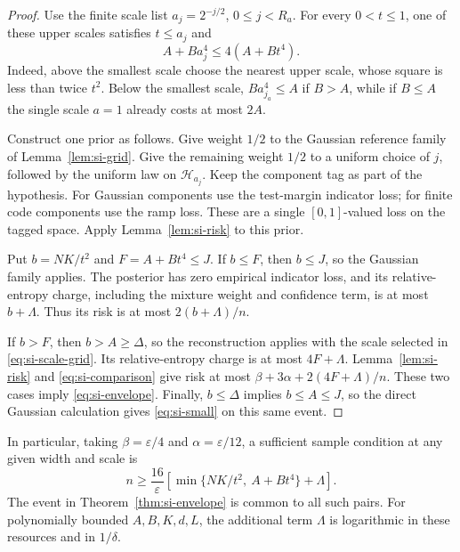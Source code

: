 \begin{proof}
Use the finite scale list $a_j=2^{-j/2}$, $0\le j<R_a$.
For every $0<t\le1$, one of these upper scales satisfies $t\le a_j$ and
\begin{equation}\label{eq:si-scale-grid}
 A+Ba_j^4\le4(A+Bt^4).
\end{equation}
Indeed, above the smallest scale choose the nearest upper scale, whose
square is less than twice $t^2$. Below the smallest scale,
$Ba_{j_a}^4\le A$ if $B>A$, while if $B\le A$ the single scale $a=1$
already costs at most $2A$.

Construct one prior as follows. Give weight $1/2$ to the Gaussian
reference family of Lemma~\ref{lem:si-grid}. Give the remaining weight
$1/2$ to a uniform choice of $j$, followed by the uniform law on
$\mathcal H_{a_j}$. Keep the component tag as part of the hypothesis.
For Gaussian components use the test-margin indicator loss; for finite
code components use the ramp loss. These are a single $[0,1]$-valued loss
on the tagged space. Apply Lemma~\ref{lem:si-risk} to this prior.

Put $b=NK/t^2$ and $F=A+Bt^4\le J$.
If $b\le F$, then $b\le J$, so the Gaussian family applies. The
posterior has zero empirical indicator loss, and its relative-entropy
charge, including the mixture weight and confidence term, is at most
$b+\Lambda$. Thus its risk is at most $2(b+\Lambda)/n$.

If $b>F$, then $b>A\ge\Delta$, so the reconstruction applies with the
scale selected in \eqref{eq:si-scale-grid}. Its relative-entropy charge
is at most $4F+\Lambda$. Lemma~\ref{lem:si-risk} and
\eqref{eq:si-comparison} give risk at most
$\beta+3\alpha+2(4F+\Lambda)/n$.
These two cases imply \eqref{eq:si-envelope}.
Finally, $b\le\Delta$ implies $b\le A\le J$, so the direct Gaussian
calculation gives \eqref{eq:si-small} on this same event.
\end{proof}

In particular, taking $\beta=\varepsilon/4$ and
$\alpha=\varepsilon/12$, a sufficient sample condition at any given
width and scale is
\begin{equation}\label{eq:si-sample-envelope}
 n\ge\frac{16}{\varepsilon}
       \left[\min\{NK/t^2,\ A+Bt^4\}+\Lambda\right].
\end{equation}
The event in Theorem~\ref{thm:si-envelope} is common to all such pairs.
For polynomially bounded $A,B,K,d,L$, the additional term $\Lambda$
is logarithmic in these resources and in $1/\delta$.


